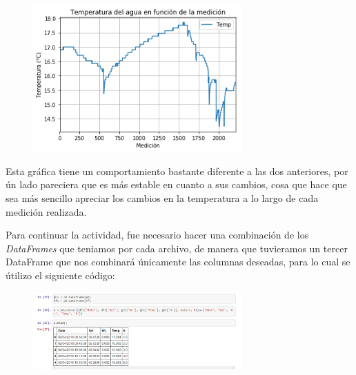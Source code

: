 \documentclass{article}
\begin{document}
\begin{figure}[htb]
    \begin{center}
    \includegraphics[width=8cm]{TemperaturaMedicion.png}
    \end{center}
\end{figure}  
Esta gráfica tiene un comportamiento bastante diferente a las dos anteriores, por ún lado pareciera que es más estable en cuanto a sus cambios, cosa que hace que sea más sencillo apreciar los cambios en la temperatura a lo largo de cada medición realizada. 

Para continuar la actividad, fue necesario hacer una combinación de los \textit{DataFrames} que teniamos por cada archivo, de manera que tuvieramos un tercer DataFrame que nos combinará únicamente las columnas deseadas, para lo cual se útilizo el siguiente código: 

\begin{figure}[htb]
    \begin{center}
    \includegraphics[width=8cm]{MergeData.PNG}
    \end{center}
\end{figure}  
\end{document}
